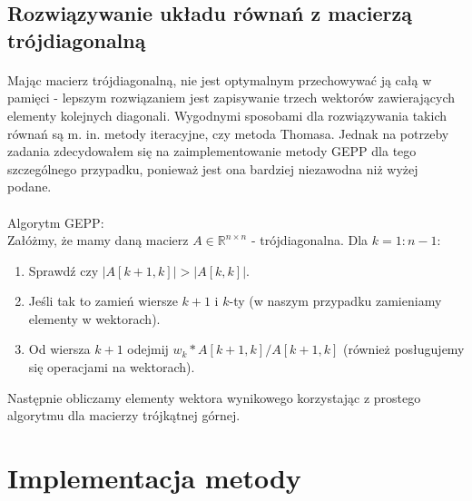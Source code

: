 \documentclass{article}
\begin{document}
\subsection{Rozwiązywanie układu równań z macierzą trójdiagonalną}
\paragraph{}
Mając macierz trójdiagonalną, nie jest optymalnym przechowywać ją całą w pamięci - lepszym rozwiązaniem jest zapisywanie trzech wektorów zawierających elementy kolejnych diagonali. Wygodnymi sposobami dla rozwiązywania takich równań są m. in. metody iteracyjne, czy metoda Thomasa. Jednak na potrzeby zadania zdecydowałem się na zaimplementowanie metody GEPP dla tego szczególnego przypadku, ponieważ jest ona bardziej niezawodna niż wyżej podane.
\paragraph{}
Algorytm GEPP:\\
Załóżmy, że mamy daną macierz $A\in\mathbb{R}^{n\times n}$ - trójdiagonalna. Dla $k=1:n-1$:
\begin{enumerate}
\item Sprawdź czy $|A[k+1,k]| > |A[k,k]|$.
\item Jeśli tak to zamień wiersze $k+1$ i $k$-ty (w naszym przypadku zamieniamy elementy w wektorach).
\item Od wiersza $k+1$ odejmij $w_{k}*A[k+1,k]/A[k+1,k]$ (również posługujemy się operacjami na wektorach).
\end{enumerate}
Następnie obliczamy elementy wektora wynikowego korzystając z prostego algorytmu dla macierzy trójkątnej górnej.
\section{Implementacja metody}
\end{document}
